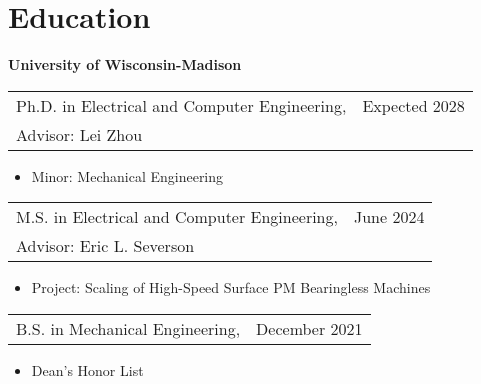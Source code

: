 \section{\sc Education}

 {\bf University of Wisconsin-Madison}\\
\begin{tabular}{@{}p{4.5in}>{\raggedleft\arraybackslash}p{1in}}
    Ph.D. in Electrical and Computer Engineering, & Expected 2028 \\
    Advisor: Lei Zhou                             &               \\
\end{tabular}
\begin{itemize}
    \item Minor: Mechanical Engineering
\end{itemize}

\begin{tabular}{@{}p{4.5in}>{\raggedleft\arraybackslash}p{1in}}
    M.S. in Electrical and Computer Engineering, & June 2024 \\
    Advisor: Eric L. Severson                    &           \\
\end{tabular}
\begin{itemize}
    \item Project: Scaling of High-Speed Surface PM Bearingless Machines
\end{itemize}
\begin{tabular}{@{}p{4.5in}>{\raggedleft\arraybackslash}p{1in}}
    B.S. in Mechanical Engineering, & December 2021 \\
\end{tabular}
\begin{itemize}
    \item Dean's Honor List
\end{itemize}
\endinput